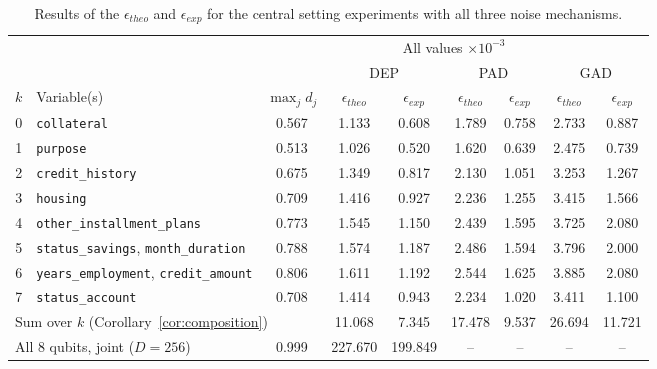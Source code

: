 \documentclass{ieeeaccess}
\begin{document}
\begin{table}[!t]
  \caption{Results of the $\epsilon_{theo}$ and $\epsilon_{exp}$ for the central setting experiments with all three noise mechanisms.} 
  \label{tab:central_results}
  \centering
  \begin{tabular}{clccccccc}
    \toprule
     & & \multicolumn{7}{c}{All values $\times 10^{-3}$} \\
    \cmidrule(l){3-9}
     & & & \multicolumn{2}{c}{DEP} & \multicolumn{2}{c}{PAD} & \multicolumn{2}{c}{GAD} \\
    \cmidrule(lr){4-5} \cmidrule(lr){6-7} \cmidrule(l){8-9}
    $k$ & Variable(s) & $\max_j d_j$ & $\epsilon_{theo}$ & $\epsilon_{exp}$ & $\epsilon_{theo}$ & $\epsilon_{exp}$ & $\epsilon_{theo}$ & $\epsilon_{exp}$ \\
    \midrule
    0 & \texttt{collateral}                                 & 0.567 & 1.133 & 0.608 & 1.789 & 0.758 & 2.733 & 0.887 \\
    1 & \texttt{purpose}                                    & 0.513 & 1.026 & 0.520 & 1.620 & 0.639 & 2.475 & 0.739 \\
    2 & \texttt{credit\_history}                            & 0.675 & 1.349 & 0.817 & 2.130 & 1.051 & 3.253 & 1.267 \\
    3 & \texttt{housing}                                    & 0.709 & 1.416 & 0.927 & 2.236 & 1.255 & 3.415 & 1.566 \\
    4 & \texttt{other\_installment\_plans}                  & 0.773 & 1.545 & 1.150 & 2.439 & 1.595 & 3.725 & 2.080 \\
    5 & \texttt{status\_savings}, \texttt{month\_duration}  & 0.788 & 1.574 & 1.187 & 2.486 & 1.594 & 3.796 & 2.000 \\
    6 & \texttt{years\_employment}, \texttt{credit\_amount} & 0.806 & 1.611 & 1.192 & 2.544 & 1.625 & 3.885 & 2.080 \\
    7 & \texttt{status\_account}                            & 0.708 & 1.414 & 0.943 & 2.234 & 1.020 & 3.411 & 1.100 \\
    \midrule
    \multicolumn{3}{l}{Sum over $k$ (Corollary~\ref{cor:composition})} & 11.068 & 7.345 & 17.478 & 9.537 & 26.694 & 11.721 \\
    \midrule
    \multicolumn{2}{l}{All 8 qubits, joint ($D = 256$)} & 0.999 & 227.670 & 199.849 & -- & -- & -- & -- \\
    \bottomrule
  \end{tabular}
\end{table}
\end{document}
